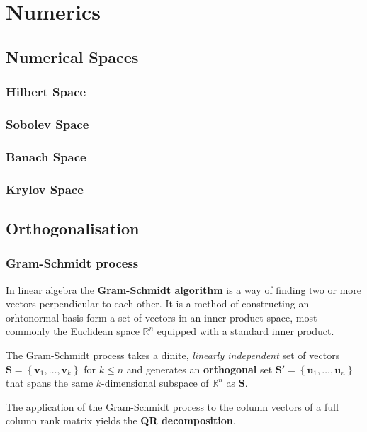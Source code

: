\newpage
\chapter{Numerics}

\section{Numerical Spaces}

\subsection{Hilbert Space}
\subsection{Sobolev Space}
\subsection{Banach Space}
\subsection{Krylov Space}

\section{Orthogonalisation}
\subsection{Gram-Schmidt process}

In linear algebra the \textbf{Gram-Schmidt algorithm} is a way of finding two
or more vectors perpendicular to each other. It is a method of constructing an
orhtonormal basis form a set of vectors in  an inner product space, most commonly
the Euclidean space $ \mathbb{R}^n $ equipped with a standard inner product.

The Gram-Schmidt process takes a dinite, \textit{linearly independent} set of
vectors $ \mathbf{S} = \left\{ \mathbf{v}_1, \dots, \mathbf{v}_k \right\} $ for $ k \le n $ and
generates an \textbf{orthogonal} set $ \mathbf{S}' = \left\{ \mathbf{u}_1, \dots, \mathbf{u}_n \right\} $
that spans the same $ k $-dimensional subspace of $ \mathbb{R}^n $ as $ \mathbf{S} $.

The application of the Gram-Schmidt process to the column vectors of a full
column rank matrix yields the \textbf{QR decomposition}.

